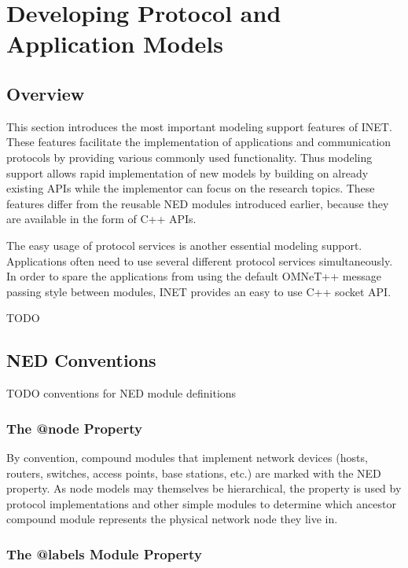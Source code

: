 \chapter{Developing Protocol and Application Models}
\label{cha:developing-models}

\section{Overview}

This section introduces the most important modeling support features of
INET. These features facilitate the implementation of applications and
communication protocols by providing various commonly used functionality.
Thus modeling support allows rapid implementation of new models by building
on already existing APIs while the implementor can focus on the research
topics. These features differ from the reusable NED modules introduced
earlier, because they are available in the form of C++ APIs.

The easy usage of protocol services is another essential modeling support.
Applications often need to use several different protocol services
simultaneously. In order to spare the applications from using the default
OMNeT++ message passing style between modules, INET provides an easy to use
C++ socket API.

\ifdraft TODO
\section{NED Conventions}

TODO conventions for NED module definitions

\subsection{The @node Property}

By convention, compound modules that implement network devices (hosts,
routers, switches, access points, base stations, etc.) are marked with the
 NED property. As node models may themselves be hierarchical, the
 property is used by protocol implementations and other simple
modules to determine which ancestor compound module represents the physical
network node they live in.

\subsection{The @labels Module Property}

